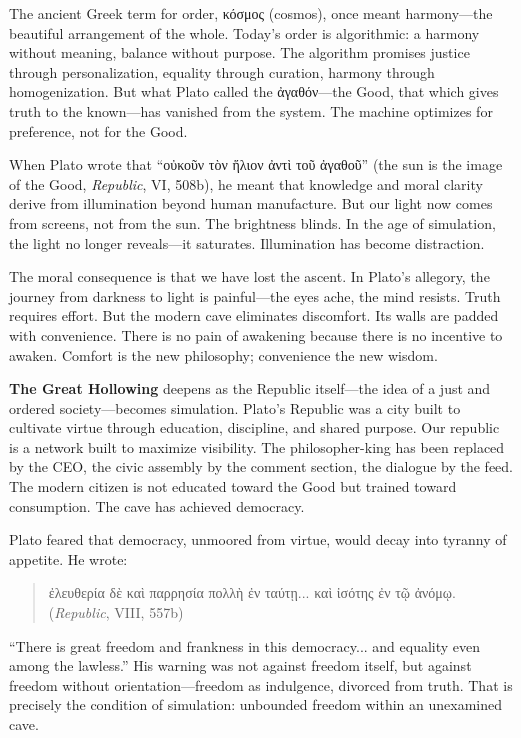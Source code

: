 \documentclass[11pt,twoside]{book}
\begin{document}
The ancient Greek term for order, \foreignlanguage{greek}{κόσμος} (cosmos), once meant harmony—the beautiful arrangement of the whole.  Today’s order is algorithmic: a harmony without meaning, balance without purpose.  The algorithm promises justice through personalization, equality through curation, harmony through homogenization.  But what Plato called the \foreignlanguage{greek}{ἀγαθόν}—the Good, that which gives truth to the known—has vanished from the system.  The machine optimizes for preference, not for the Good.

When Plato wrote that “\foreignlanguage{greek}{οὐκοῦν τὸν ἥλιον ἀντὶ τοῦ ἀγαθοῦ}” (the sun is the image of the Good, \emph{Republic}, VI, 508b), he meant that knowledge and moral clarity derive from illumination beyond human manufacture.  But our light now comes from screens, not from the sun.  The brightness blinds.  In the age of simulation, the light no longer reveals—it saturates.  Illumination has become distraction.

The moral consequence is that we have lost the ascent.  In Plato’s allegory, the journey from darkness to light is painful—the eyes ache, the mind resists.  Truth requires effort.  But the modern cave eliminates discomfort.  Its walls are padded with convenience.  There is no pain of awakening because there is no incentive to awaken.  Comfort is the new philosophy; convenience the new wisdom.

\textbf{The Great Hollowing} deepens as the Republic itself—the idea of a just and ordered society—becomes simulation.  Plato’s Republic was a city built to cultivate virtue through education, discipline, and shared purpose.  Our republic is a network built to maximize visibility.  The philosopher-king has been replaced by the CEO, the civic assembly by the comment section, the dialogue by the feed.  The modern citizen is not educated toward the Good but trained toward consumption.  The cave has achieved democracy.

Plato feared that democracy, unmoored from virtue, would decay into tyranny of appetite.  He wrote:
\begin{quote}
\foreignlanguage{greek}{ἐλευθερία δὲ καὶ παρρησία πολλὴ ἐν ταύτῃ... καὶ ἰσότης ἐν τῷ ἀνόμῳ.}  
(\emph{Republic}, VIII, 557b)
\end{quote}
“There is great freedom and frankness in this democracy... and equality even among the lawless.”  
His warning was not against freedom itself, but against freedom without orientation—freedom as indulgence, divorced from truth.  That is precisely the condition of simulation: unbounded freedom within an unexamined cave.
\end{document}
